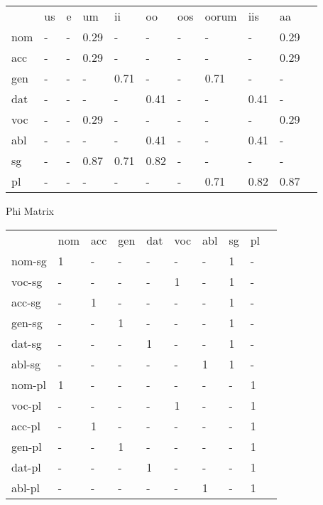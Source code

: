 \documentclass{article}
\begin{document}
\begin{tabular}{lllllllllll}\toprule
                  &us      &e       &um      &ii      &oo      &oos     &oorum   &iis     &aa      \\ 
nom            &    -   &    -   &  0.29  &    -   &    -   &    -   &    -   &    -   &  0.29  \\ 
acc            &    -   &    -   &  0.29  &    -   &    -   &    -   &    -   &    -   &  0.29  \\ 
gen            &    -   &    -   &    -   &  0.71  &    -   &    -   &  0.71  &    -   &    -   \\ 
dat            &    -   &    -   &    -   &    -   &  0.41  &    -   &    -   &  0.41  &    -   \\ 
voc            &    -   &    -   &  0.29  &    -   &    -   &    -   &    -   &    -   &  0.29  \\ 
abl            &    -   &    -   &    -   &    -   &  0.41  &    -   &    -   &  0.41  &    -   \\ 
sg             &    -   &    -   &  0.87  &  0.71  &  0.82  &    -   &    -   &    -   &    -   \\ 
pl             &    -   &    -   &    -   &    -   &    -   &    -   &  0.71  &  0.82  &  0.87  \\ 
\end{tabular}


Phi Matrix 

\begin{tabular}{llllllllll}\toprule
                &nom     &acc     &gen     &dat     &voc     &abl     &sg      &pl      \\ 
nom-sg     &     1  &    -   &    -   &    -   &    -   &    -   &     1  &    -   \\ 
voc-sg     &    -   &    -   &    -   &    -   &     1  &    -   &     1  &    -   \\ 
acc-sg     &    -   &     1  &    -   &    -   &    -   &    -   &     1  &    -   \\ 
gen-sg     &    -   &    -   &     1  &    -   &    -   &    -   &     1  &    -   \\ 
dat-sg     &    -   &    -   &    -   &     1  &    -   &    -   &     1  &    -   \\ 
abl-sg     &    -   &    -   &    -   &    -   &    -   &     1  &     1  &    -   \\ 
nom-pl     &     1  &    -   &    -   &    -   &    -   &    -   &    -   &     1  \\ 
voc-pl     &    -   &    -   &    -   &    -   &     1  &    -   &    -   &     1  \\ 
acc-pl     &    -   &     1  &    -   &    -   &    -   &    -   &    -   &     1  \\ 
gen-pl     &    -   &    -   &     1  &    -   &    -   &    -   &    -   &     1  \\ 
dat-pl     &    -   &    -   &    -   &     1  &    -   &    -   &    -   &     1  \\ 
abl-pl     &    -   &    -   &    -   &    -   &    -   &     1  &    -   &     1  \\ 
\end{tabular}
\end{document}
